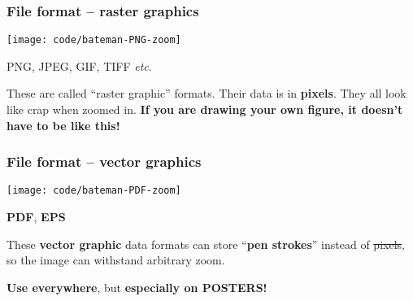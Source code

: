 \documentclass{beamer}
\makeatletter
\newcommand{\eg}{\textit{e.g.},\xspace} %
\newcommand{\etc}{\textit{etc}.\@\xspace}
\newcommand{\key}[1]{\textcolor{keyred}{{\bf #1}}}
\makeatother
\begin{document}
%



\begin{frame}
\frametitle{File format -- raster graphics}
\begin{center}
\texttt{[image: code/bateman-PNG-zoom]}
\end{center}\vspace{-1em}
PNG, JPEG, GIF, TIFF \etc \pause \key{\faThumbsDown}

These are called ``raster graphic'' formats.  Their data is in \key{pixels}.
They all look like crap when zoomed in.
\key{If you are drawing your own figure, it doesn't have to be like this!}
\end{frame}


\begin{frame}
\frametitle{File format -- vector graphics}
\begin{center}
\texttt{[image: code/bateman-PDF-zoom]}
\end{center}\vspace{-1em}
\key{PDF}, \key{EPS} \faThumbsUp

These \key{vector graphic} data formats can store ``\key{pen strokes}'' instead of \sout{pixels}, so the image can withstand arbitrary zoom.

\key{Use everywhere}, but \key{especially on {\large POSTERS}!}
\end{frame}
\end{document}
